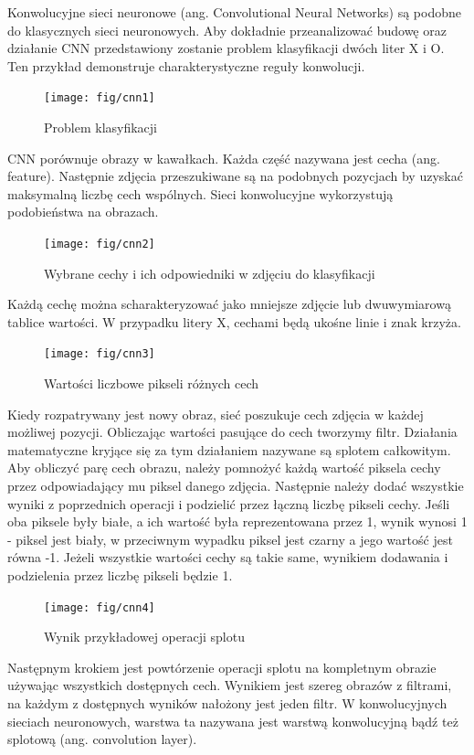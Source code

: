\documentclass[brudnopis]{xmgr}
\begin{document}
Konwolucyjne sieci neuronowe (ang. Convolutional Neural Networks) są podobne do klasycznych sieci neuronowych. Aby dokładnie przeanalizować budowę oraz działanie CNN przedstawiony zostanie problem klasyfikacji dwóch liter X i O. Ten przykład demonstruje charakterystyczne reguły konwolucji.

\begin{figure}[!tbh]
\centering
\texttt{[image: fig/cnn1]}
\caption{Problem klasyfikacji}
\end{figure}

CNN porównuje obrazy w kawałkach. Każda część nazywana jest cecha (ang. feature). Następnie zdjęcia przeszukiwane są na podobnych pozycjach by uzyskać maksymalną liczbę cech wspólnych. Sieci konwolucyjne wykorzystują podobieństwa na obrazach.
\newpage

\begin{figure}[!tbh]
\centering
\texttt{[image: fig/cnn2]}
\caption{Wybrane cechy i ich odpowiedniki w zdjęciu do klasyfikacji}
\end{figure}

Każdą cechę można scharakteryzować jako mniejsze zdjęcie lub dwuwymiarową tablice wartości. W przypadku litery X, cechami będą ukośne linie i znak krzyża.

\begin{figure}[!tbh]
\centering
\texttt{[image: fig/cnn3]}
\caption{Wartości liczbowe pikseli różnych cech}
\end{figure}
\newpage

Kiedy rozpatrywany jest nowy obraz, sieć poszukuje cech zdjęcia w każdej możliwej pozycji. Obliczając wartości pasujące do cech tworzymy filtr. Działania matematyczne kryjące się za tym działaniem nazywane są splotem całkowitym. Aby obliczyć parę cech obrazu, należy pomnożyć każdą wartość piksela cechy przez odpowiadający mu piksel danego zdjęcia. Następnie należy dodać wszystkie wyniki z poprzednich operacji i podzielić przez łączną liczbę pikseli cechy. Jeśli oba piksele były białe, a ich wartość była reprezentowana przez 1, wynik wynosi 1 - piksel jest biały, w przeciwnym wypadku piksel jest czarny a jego wartość jest równa -1. Jeżeli wszystkie wartości cechy są takie same, wynikiem dodawania i podzielenia przez liczbę pikseli będzie 1.

\begin{figure}[!tbh]
\centering
\texttt{[image: fig/cnn4]}
\caption{Wynik przykładowej operacji splotu}
\end{figure}
\newpage

Następnym krokiem jest powtórzenie operacji splotu na kompletnym obrazie używając wszystkich dostępnych cech. Wynikiem jest szereg obrazów z filtrami, na każdym z dostępnych wyników nałożony jest jeden filtr. W konwolucyjnych sieciach neuronowych, warstwa ta nazywana jest warstwą konwolucyjną bądź też splotową (ang. convolution layer).
\end{document}
